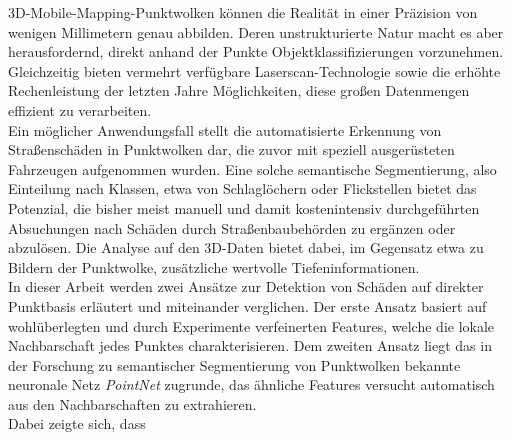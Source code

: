 

\pfinal
3D-Mobile-Mapping-Punktwolken können die Realität in einer Präzision von wenigen Millimetern genau abbilden. Deren unstrukturierte Natur macht es aber herausfordernd, direkt anhand der Punkte Objektklassifizierungen vorzunehmen. Gleichzeitig bieten vermehrt verfügbare Laserscan-Technologie sowie die erhöhte Rechenleistung der letzten Jahre Möglichkeiten, diese großen Datenmengen effizient zu verarbeiten. \\
Ein möglicher Anwendungsfall stellt die automatisierte Erkennung von Straßenschäden in Punktwolken dar, die zuvor mit speziell ausgerüsteten Fahrzeugen aufgenommen wurden. Eine solche semantische Segmentierung, also Einteilung nach Klassen, etwa von Schlaglöchern oder Flickstellen bietet das Potenzial, die bisher meist manuell und damit kostenintensiv durchgeführten Absuchungen nach Schäden durch Straßenbaubehörden zu ergänzen oder abzulösen. Die Analyse auf den 3D-Daten bietet dabei, im Gegensatz etwa zu Bildern der Punktwolke, zusätzliche wertvolle Tiefeninformationen. \\
In dieser Arbeit werden zwei Ansätze zur Detektion von Schäden auf direkter Punktbasis erläutert und miteinander verglichen. Der erste Ansatz basiert auf wohlüberlegten und durch Experimente verfeinerten Features, welche die lokale Nachbarschaft jedes Punktes charakterisieren. Dem zweiten Ansatz liegt das in der Forschung zu semantischer Segmentierung von Punktwolken bekannte neuronale Netz \textit{PointNet} zugrunde, das ähnliche Features versucht automatisch aus den Nachbarschaften zu extrahieren. \\
Dabei zeigte sich, dass %

\cleardoublepage
